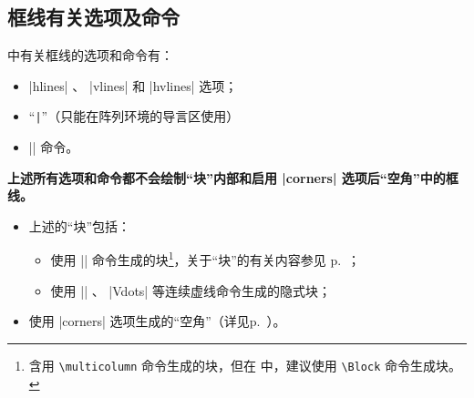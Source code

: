 \documentclass[dvipsnames]{article}%
\begin{document}

\subsection{框线有关选项及命令}
 中有关框线的选项和命令有：
\begin{itemize}
  \item |hlines| 、 |vlines| 和 |hvlines| 选项；
  \item “\verb+|+”（只能在阵列环境的导言区使用）
  \item  |\Hline| 命令。
\end{itemize}
% 
\medskip
\textbf{上述所有选项和命令都不会绘制“块”内部和启用 |corners| 选项后“空角”中的框线。}
\begin{itemize} 
  \item 上述的“块”包括：
\begin{itemize}
  \item 使用 |\Block| 命令生成的块\footnote{含用 \texttt{\textbackslash multicolumn} 命令生成的块，但在  中，建议使用 \texttt{\textbackslash Block} 命令生成块。}，关于“块”的有关内容参见 p.~\pageref{Block}；
  \item 使用 |\Cdots| 、 |Vdots| 等连续虚线命令生成的隐式块；
\end{itemize}
  \item 使用 |corners| 选项生成的“空角”（详见p.~\pageref{corners}）。
\end{itemize}
\end{document}

